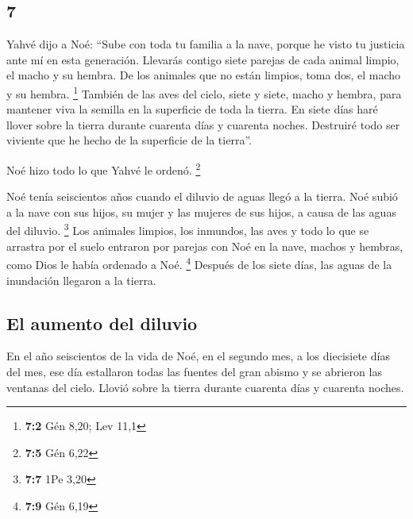 \begin{paracol}{2}
\hypertarget{section-12}{%
\section{7}\label{section-12}}

 Yahvé dijo a Noé: ``Sube con toda tu familia a la nave,
porque he visto tu justicia ante mí en esta generación. 
Llevarás contigo siete parejas de cada animal limpio, el macho y su
hembra. De los animales que no están limpios, toma dos, el macho y su
hembra. \footnote{\textbf{7:2} Gén 8,20; Lev 11,1} 
También de las aves del cielo, siete y siete, macho y hembra, para
mantener viva la semilla en la superficie de toda la tierra.
 En siete días haré llover sobre la tierra durante
cuarenta días y cuarenta noches. Destruiré todo ser viviente que he
hecho de la superficie de la tierra''.

 Noé hizo todo lo que Yahvé le ordenó. \footnote{\textbf{7:5}
  Gén 6,22}

 Noé tenía seiscientos años cuando el diluvio de aguas
llegó a la tierra.  Noé subió a la nave con sus hijos, su
mujer y las mujeres de sus hijos, a causa de las aguas del diluvio.
\footnote{\textbf{7:7} 1Pe 3,20}  Los animales limpios,
los inmundos, las aves y todo lo que se arrastra por el suelo
 entraron por parejas con Noé en la nave, machos y
hembras, como Dios le había ordenado a Noé. \footnote{\textbf{7:9} Gén
  6,19}  Después de los siete días, las aguas de la
inundación llegaron a la tierra.

\hypertarget{el-aumento-del-diluvio}{%
\subsection{El aumento del diluvio}\label{el-aumento-del-diluvio}}

 En el año seiscientos de la vida de Noé, en el segundo
mes, a los diecisiete días del mes, ese día estallaron todas las fuentes
del gran abismo y se abrieron las ventanas del cielo. 
Llovió sobre la tierra durante cuarenta días y cuarenta noches.


\end{paracol}
